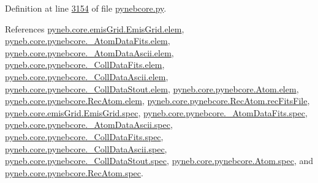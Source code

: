 Definition at line \hyperlink{pynebcore_8py_source_l03154}{3154} of file \hyperlink{pynebcore_8py_source}{pynebcore.\-py}.



References \hyperlink{emis_grid_8py_source_l00048}{pyneb.\-core.\-emis\-Grid.\-Emis\-Grid.\-elem}, \hyperlink{pynebcore_8py_source_l00090}{pyneb.\-core.\-pynebcore.\-\_\-\-Atom\-Data\-Fits.\-elem}, \hyperlink{pynebcore_8py_source_l00311}{pyneb.\-core.\-pynebcore.\-\_\-\-Atom\-Data\-Ascii.\-elem}, \hyperlink{pynebcore_8py_source_l00577}{pyneb.\-core.\-pynebcore.\-\_\-\-Coll\-Data\-Fits.\-elem}, \hyperlink{pynebcore_8py_source_l00927}{pyneb.\-core.\-pynebcore.\-\_\-\-Coll\-Data\-Ascii.\-elem}, \hyperlink{pynebcore_8py_source_l01163}{pyneb.\-core.\-pynebcore.\-\_\-\-Coll\-Data\-Stout.\-elem}, \hyperlink{pynebcore_8py_source_l01219}{pyneb.\-core.\-pynebcore.\-Atom.\-elem}, \hyperlink{pynebcore_8py_source_l02636}{pyneb.\-core.\-pynebcore.\-Rec\-Atom.\-elem}, \hyperlink{pynebcore_8py_source_l02646}{pyneb.\-core.\-pynebcore.\-Rec\-Atom.\-rec\-Fits\-File}, \hyperlink{emis_grid_8py_source_l00049}{pyneb.\-core.\-emis\-Grid.\-Emis\-Grid.\-spec}, \hyperlink{pynebcore_8py_source_l00091}{pyneb.\-core.\-pynebcore.\-\_\-\-Atom\-Data\-Fits.\-spec}, \hyperlink{pynebcore_8py_source_l00312}{pyneb.\-core.\-pynebcore.\-\_\-\-Atom\-Data\-Ascii.\-spec}, \hyperlink{pynebcore_8py_source_l00578}{pyneb.\-core.\-pynebcore.\-\_\-\-Coll\-Data\-Fits.\-spec}, \hyperlink{pynebcore_8py_source_l00928}{pyneb.\-core.\-pynebcore.\-\_\-\-Coll\-Data\-Ascii.\-spec}, \hyperlink{pynebcore_8py_source_l01164}{pyneb.\-core.\-pynebcore.\-\_\-\-Coll\-Data\-Stout.\-spec}, \hyperlink{pynebcore_8py_source_l01220}{pyneb.\-core.\-pynebcore.\-Atom.\-spec}, and \hyperlink{pynebcore_8py_source_l02637}{pyneb.\-core.\-pynebcore.\-Rec\-Atom.\-spec}.


